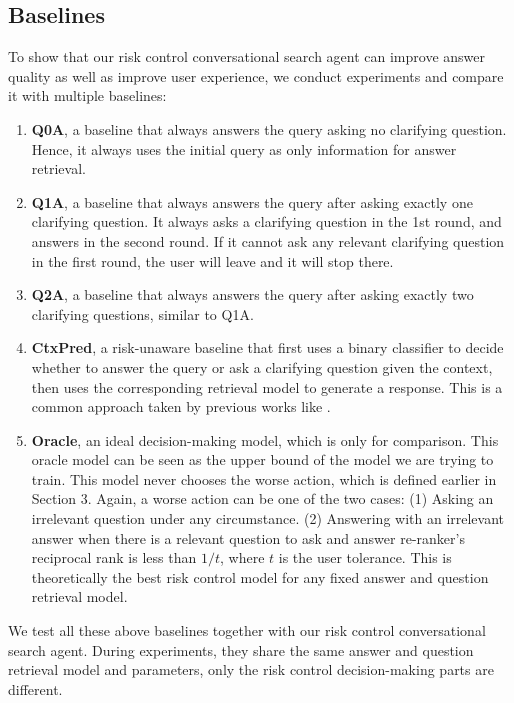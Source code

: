\documentclass[format=acmsmall, review=False, screen=true]{acmart}
\begin{document}
\subsection{Baselines}
To show that our risk control conversational search agent can improve answer quality as well as improve user experience, we conduct experiments and compare it with multiple baselines:
\begin{enumerate}
    \item \textbf{Q0A}, a baseline that always answers the query asking no clarifying question. Hence, it always uses the initial query as only information for answer retrieval.
    
    \item \textbf{Q1A}, a baseline that always answers the query after asking exactly one clarifying question. It always asks a clarifying question in the 1st round, and answers in the second round. If it cannot ask any relevant clarifying question in the first round, the user will leave and it will stop there.
    
    \item \textbf{Q2A}, a baseline that always answers the query after asking exactly two clarifying questions, similar to Q1A.
    
    \item \textbf{CtxPred}, a risk-unaware baseline that first uses a binary classifier to decide whether to answer the query or ask a clarifying question given the context, then uses the corresponding retrieval model to generate a response. This is a common approach taken by previous works like \cite{xuasking2019, aliannejadi2020convai3}.
    
    \item \textbf{Oracle}, an ideal decision-making model, which is only for comparison. This oracle model can be seen as the upper bound of the model we are trying to train. This model never chooses the worse action, which is defined earlier in Section 3. Again, a worse action can be one of the two cases: (1) Asking an irrelevant question under any circumstance. (2) Answering with an irrelevant answer when there is a relevant question to ask and answer re-ranker's reciprocal rank is less than $1/t$, where $t$ is the user tolerance. This is theoretically the best risk control model for any fixed answer and question retrieval model.
\end{enumerate}

We test all these above baselines together with our risk control conversational search agent. During experiments, they share the same answer and question retrieval model and parameters, only the risk control decision-making parts are different.
\end{document}
